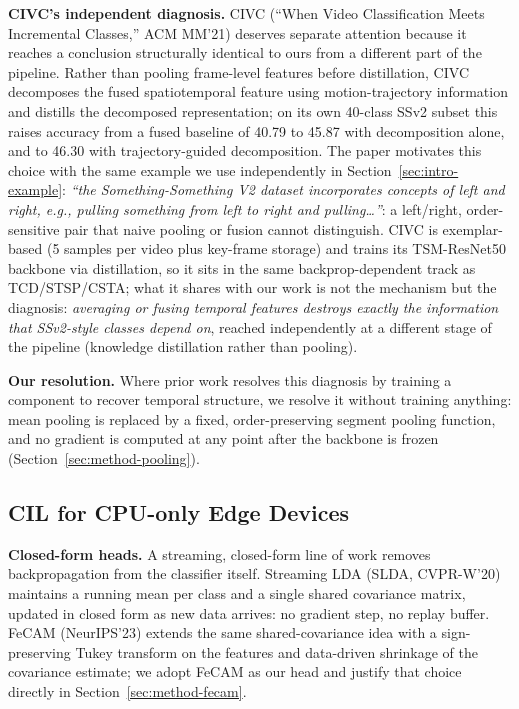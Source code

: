 \documentclass[11pt]{article}
\begin{document}
\textbf{CIVC's independent diagnosis.} CIVC (``When Video Classification Meets Incremental Classes,'' ACM MM'21)
deserves separate attention because it reaches a conclusion structurally
identical to ours from a different part of the pipeline. Rather than pooling
frame-level features before distillation, CIVC decomposes the fused
spatiotemporal feature using motion-trajectory information and distills the
decomposed representation; on its own 40-class SSv2 subset this raises
accuracy from a fused baseline of 40.79 to 45.87 with decomposition alone,
and to 46.30 with trajectory-guided decomposition. The paper motivates this
choice with the same example we use independently in
Section~\ref{sec:intro-example}: \emph{``the Something-Something V2 dataset
incorporates concepts of left and right, e.g., pulling something from left
to right and pulling\ldots''}: a left/right, order-sensitive pair that
naive pooling or fusion cannot distinguish. CIVC is exemplar-based (5
samples per video plus key-frame storage) and trains its TSM-ResNet50
backbone via distillation, so it sits in the same backprop-dependent track
as TCD/STSP/CSTA; what it shares with our work is not the mechanism but the
diagnosis: \emph{averaging or fusing temporal features destroys exactly the
information that SSv2-style classes depend on}, reached independently at a
different stage of the pipeline (knowledge distillation rather than
pooling).

\textbf{Our resolution.} Where prior work resolves this diagnosis by training a component to recover
temporal structure, we resolve it without training anything: mean pooling
is replaced by a fixed, order-preserving segment pooling function, and no
gradient is computed at any point after the backbone is frozen
(Section~\ref{sec:method-pooling}).

\subsection{CIL for CPU-only Edge Devices}

\textbf{Closed-form heads.} A streaming, closed-form line of work removes backpropagation from the
classifier itself. Streaming LDA (SLDA, CVPR-W'20) maintains a running mean
per class and a single shared covariance matrix, updated in closed form as
new data arrives: no gradient step, no replay buffer. FeCAM (NeurIPS'23)
extends the same shared-covariance idea with a sign-preserving Tukey
transform on the features and data-driven shrinkage of the covariance
estimate; we adopt FeCAM as our head and justify that choice directly in
Section~\ref{sec:method-fecam}.
\end{document}
